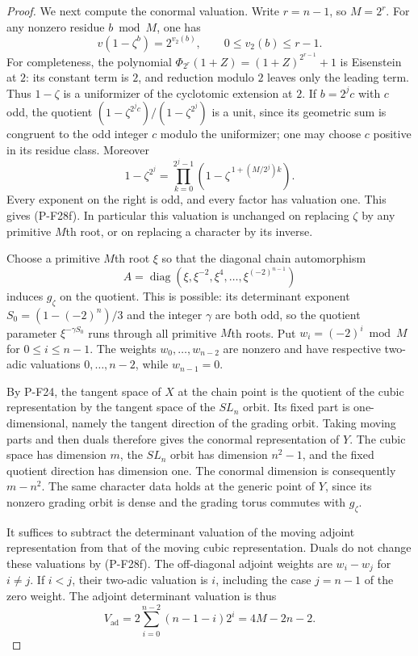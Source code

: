 \documentclass[11pt,a4paper]{article}
\begin{document}
\begin{proof}
We next compute the conormal valuation. Write
$r=n-1$, so $M=2^r$. For any nonzero residue
$b\bmod M$, one has
\[
 v(1-\zeta^b)=2^{v_2(b)},
 \qquad 0\le v_2(b)\le r-1.
 \tag{P-F28f}
\]
For completeness, the polynomial
$\Phi_{2^r}(1+Z)=(1+Z)^{2^{r-1}}+1$
is Eisenstein at $2$: its constant term is $2$,
and reduction modulo $2$ leaves only the leading
term. Thus $1-\zeta$ is a uniformizer of the
cyclotomic extension at $2$.
If $b=2^j c$ with $c$ odd, the quotient
$(1-\zeta^{2^j c})/(1-\zeta^{2^j})$ is a unit,
since its geometric sum is congruent to the odd
integer $c$ modulo the uniformizer; one may choose
$c$ positive in its residue class. Moreover
\[
 1-\zeta^{2^j}
   =\prod_{k=0}^{2^j-1}
       \left(1-\zeta^{\,1+(M/2^j)k}\right).
 \tag{P-F28g}
\]
Every exponent on the right is odd, and every factor
has valuation one. This gives (P-F28f).
In particular this valuation is unchanged on
replacing $\zeta$ by any primitive $M$th root,
or on replacing a character by its inverse.

Choose a primitive $M$th root $\xi$ so that the
diagonal chain automorphism
\[
 A=\operatorname{diag}
    (\xi,\xi^{-2},\xi^4,\ldots,\xi^{(-2)^{n-1}})
\]
induces $g_\zeta$ on the quotient. This is possible:
its determinant exponent
$S_0=(1-(-2)^n)/3$ and the integer $\gamma$ are
both odd, so the quotient parameter
$\xi^{-\gamma S_0}$ runs through all primitive
$M$th roots. Put $w_i=(-2)^i\bmod M$ for
$0\le i\le n-1$. The weights $w_0,\ldots,w_{n-2}$
are nonzero and have respective two-adic valuations
$0,\ldots,n-2$, while $w_{n-1}=0$.

By P-F24, the tangent space of $X$ at the chain point
is the quotient of the cubic representation by the
tangent space of the $SL_n$ orbit. Its fixed part is
one-dimensional, namely the tangent direction of
the grading orbit. Taking moving parts and then
duals therefore gives the conormal representation
of $Y$. The cubic space has dimension $m$, the
$SL_n$ orbit has dimension $n^2-1$, and the fixed
quotient direction has dimension one. The conormal
dimension is consequently $m-n^2$.
The same character data holds at the generic point
of $Y$, since its nonzero grading orbit is dense
and the grading torus commutes with $g_\zeta$.

It suffices to subtract the determinant valuation
of the moving adjoint representation from that
of the moving cubic representation. Duals do not
change these valuations by (P-F28f).
The off-diagonal adjoint weights are $w_i-w_j$
for $i\ne j$. If $i<j$, their two-adic valuation
is $i$, including the case $j=n-1$ of the zero
weight. The adjoint determinant valuation is thus
\[
 V_{\mathrm{ad}}
   =2\sum_{i=0}^{n-2}(n-1-i)2^i
   =4M-2n-2.
 \tag{P-F28h}
\]


\end{proof}
\end{document}
